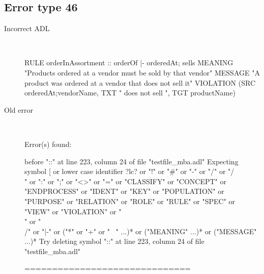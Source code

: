 \subsection{Error type 46}
  \begin{description}
  \item[Incorrect ADL]~\\
\begin{adl}
RULE orderInAssortment :: orderOf |- orderedAt; sells 
MEANING "Products ordered at a vendor must be sold by that vendor"
MESSAGE "A product was ordered at a vendor that does not sell it"
VIOLATION (SRC orderedAt;vendorName, TXT " does not sell ", TGT productName)\end{adl}
  \item[Old error]~\\
\begin{haskell}
Error(s) found:

before "::" at line 223, column 24 of file "testfile_mba.adl"
Expecting symbol [ or lower case identifier ?lc? or "!" or "#" or "-" or "/" or
"/\\" or ":" or ";" or "<>" or "=" or "CLASSIFY" or "CONCEPT" or "ENDPROCESS" or
 "IDENT" or "KEY" or "POPULATION" or "PURPOSE" or "RELATION" or "ROLE" or "RULE"
 or "SPEC" or "VIEW" or "VIOLATION" or "\\" or "\\/" or "|-" or ("*" or "+" or "
~" ...)* or ("MEANING" ...)* or ("MESSAGE" ...)*
Try deleting symbol "::" at line 223, column 24 of file "testfile_mba.adl"

==============================


\end{haskell}
\end{description}
